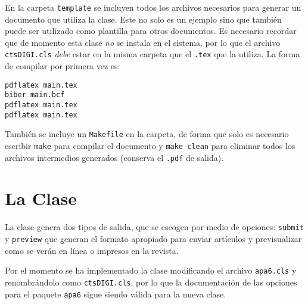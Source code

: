 \documentclass{article}
\begin{document}
En la carpeta \texttt{template} se incluyen todos los archivos necesarios para generar un documento que utiliza la clase. Este no solo es un ejemplo sino que también puede ser utilizado como plantilla para otros documentos. Es necesario recordar que de momento esta clase \emph{no} se instala en el sistema, por lo que el archivo \texttt{ctsDIGI.cls} \emph{debe} estar en la misma carpeta que el \texttt{.tex} que la utiliza. La forma de compilar por primera vez es:
\begin{verbatim}
pdflatex main.tex
biber main.bcf
pdflatex main.tex
pdflatex main.tex
\end{verbatim}
También se incluye un \texttt{Makefile} en la carpeta, de forma que solo es necesario escribir \texttt{make} para compilar el documento y \texttt{make clean} para eliminar todos los archivos intermedios generados (conserva el \texttt{.pdf} de salida).

\section{La Clase}
La clase genera dos tipos de salida, que se escogen por medio de opciones: \texttt{submit} y \texttt{preview} que generan el formato apropiado para enviar artículos y previsualizar como se verán en línea o impresos en la revista.

Por el momento se ha implementado la clase modificando el archivo \texttt{apa6.cls} y renombrándolo como \texttt{ctsDIGI.cls}, por lo que la documentación de las opciones para el paquete \texttt{apa6} sigue siendo válida para la nueva clase.
\end{document}
